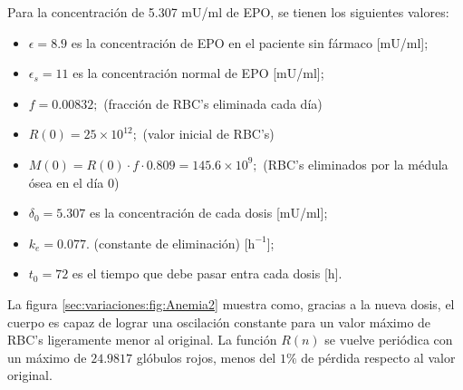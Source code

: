 Para la concentración de 5.307 mU/ml de EPO, se tienen los siguientes valores:

\begin{itemize}
    \item $\epsilon = 8.9$ es la concentración de EPO en el paciente sin fármaco [mU/ml];
    \item $\epsilon_s = 11$ es la concentración normal de EPO [mU/ml];
    \item $f=0.00832;$ (fracción de RBC's eliminada cada día)
    \item $R(0) = 25\times 10^{12};$ (valor inicial de RBC's)
    \item $M(0) = R(0)\cdot f \cdot 0.809 = 145.6\times 10^{9};$ (RBC's eliminados por la médula ósea en el día 0)
    \item $\delta_0=5.307$ es la concentración de cada dosis [mU/ml];
    \item $k_e=0.077.$ (constante de eliminación) [$\textrm{h}^{-1}$];
    \item $t_0=72$ es el tiempo que debe pasar entra cada dosis [h].
\end{itemize}

La figura \ref{sec:variaciones:fig:Anemia2} muestra como, gracias a la nueva dosis, el cuerpo es capaz de lograr una oscilación constante para un valor máximo de RBC's ligeramente menor al original. La función $R(n)$ se vuelve periódica con un máximo de $24.9817$ glóbulos rojos, menos del $1\%$ de pérdida respecto al valor original.

